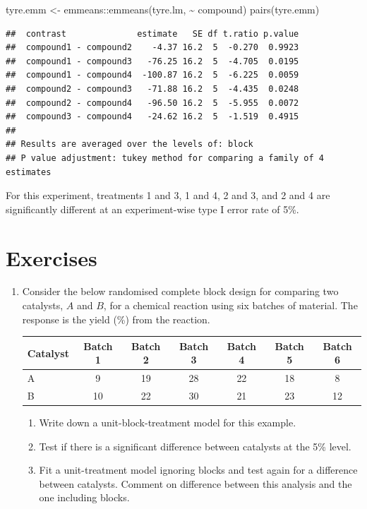 \documentclass[
]{book}
\newenvironment{Shaded}{\begin{snugshade}}{\end{snugshade}}
\newcommand{\FunctionTok}[1]{\textcolor[rgb]{0.00,0.00,0.00}{#1}}
\newcommand{\NormalTok}[1]{#1}
\newcommand{\OtherTok}[1]{\textcolor[rgb]{0.56,0.35,0.01}{#1}}
\newcommand{\SpecialCharTok}[1]{\textcolor[rgb]{0.00,0.00,0.00}{#1}}
\providecommand{\tightlist}{%
  \setlength{\itemsep}{0pt}\setlength{\parskip}{0pt}}
\theoremstyle{definition}
\theoremstyle{definition}
\theoremstyle{definition}
\theoremstyle{definition}
\theoremstyle{remark}
\begin{document}
\begin{Shaded}
\begin{Highlighting}[]
\NormalTok{tyre.emm }\OtherTok{\textless{}{-}}\NormalTok{ emmeans}\SpecialCharTok{::}\FunctionTok{emmeans}\NormalTok{(tyre.lm, }\SpecialCharTok{\textasciitilde{}}\NormalTok{ compound)}
\FunctionTok{pairs}\NormalTok{(tyre.emm)}
\end{Highlighting}
\end{Shaded}

\begin{verbatim}
##  contrast              estimate   SE df t.ratio p.value
##  compound1 - compound2    -4.37 16.2  5  -0.270  0.9923
##  compound1 - compound3   -76.25 16.2  5  -4.705  0.0195
##  compound1 - compound4  -100.87 16.2  5  -6.225  0.0059
##  compound2 - compound3   -71.88 16.2  5  -4.435  0.0248
##  compound2 - compound4   -96.50 16.2  5  -5.955  0.0072
##  compound3 - compound4   -24.62 16.2  5  -1.519  0.4915
## 
## Results are averaged over the levels of: block 
## P value adjustment: tukey method for comparing a family of 4 estimates
\end{verbatim}

For this experiment, treatments 1 and 3, 1 and 4, 2 and 3, and 2 and 4 are significantly different at an experiment-wise type I error rate of 5\%.

\hypertarget{exercises-2}{%
\section{Exercises}\label{exercises-2}}

\begin{enumerate}
\def\labelenumi{\arabic{enumi}.}
\item
  Consider the below randomised complete block design for comparing two catalysts, \(A\) and \(B\), for a chemical reaction using six batches of material. The response is the yield (\%) from the reaction.

  \begin{longtable}[]{@{}lcccccc@{}}
  \toprule()
  Catalyst & Batch 1 & Batch 2 & Batch 3 & Batch 4 & Batch 5 & Batch 6 \\
  \midrule()
  \endhead
  A & 9 & 19 & 28 & 22 & 18 & 8 \\
  B & 10 & 22 & 30 & 21 & 23 & 12 \\
  \bottomrule()
  \end{longtable}

  \begin{enumerate}
  \def\labelenumii{\roman{enumii}.}
  \tightlist
  \item
    Write down a unit-block-treatment model for this example.
  \item
    Test if there is a significant difference between catalysts at the 5\% level.
  \item
    Fit a unit-treatment model ignoring blocks and test again for a difference between catalysts. Comment on difference between this analysis and the one including blocks.
  \end{enumerate}
\end{enumerate}
\end{document}
